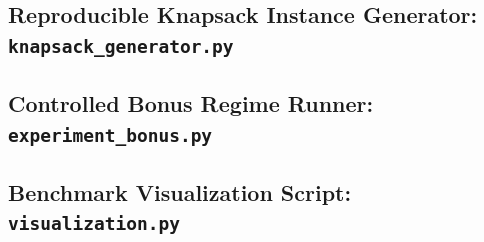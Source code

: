 \documentclass[10pt, a4paper]{article}
\begin{document}
\subsection{Reproducible Knapsack Instance Generator: \texttt{knapsack\_generator.py}}


\subsection{Controlled Bonus Regime Runner: \texttt{experiment\_bonus.py}}


\subsection{Benchmark Visualization Script: \texttt{visualization.py}}

\end{document}
